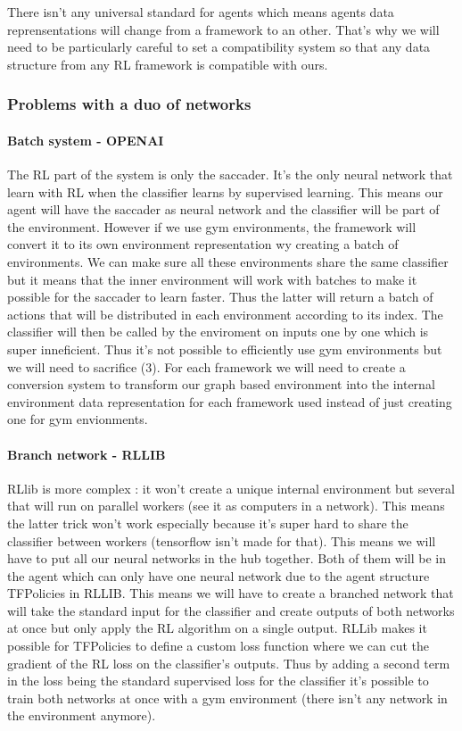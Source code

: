\documentclass[11pt]{article}
\begin{document}
There isn't any universal standard for agents which means agents data reprensentations will change from a framework to an other. That's why we will need to be particularly careful to set a compatibility system so that any data structure from any RL framework is compatible with ours.

\subsubsection{Problems with a duo of networks}
\paragraph{Batch system - OPENAI}
The RL part of the system is only the saccader. It's the only neural network that learn with RL when the classifier learns by supervised learning. This means our agent will have the saccader as neural network and the classifier will be part of the environment. However if we use gym environments, the framework will convert it to its own environment representation wy creating a batch of environments. We can make sure all these environments share the same classifier but it means that the inner environment will work with batches to make it possible for the saccader to learn faster. Thus the latter will return a batch of actions that will be distributed in each environment according to its index. The classifier will then be called by the enviroment on inputs one by one which is super inneficient. Thus it's not possible to efficiently use gym environments but we will need to sacrifice (3). For each framework we will need to create a conversion system to transform our graph based environment into the internal environment data representation for each framework used instead of just creating one for gym envionments.
\paragraph{Branch network - RLLIB}
RLlib is more complex : it won't create a unique internal environment but several that will run on parallel workers (see it as computers in a network). This means the latter trick won't work especially because it's super hard to share the classifier between workers (tensorflow isn't made for that). This means we will have to put all our neural networks in the hub together. Both of them will be in the agent which can only have one neural network due to the agent structure TFPolicies in RLLIB. This means we will have to create a branched network that will take the standard input for the classifier and create outputs of both networks at once but only apply the RL algorithm on a single output. RLLib makes it possible for TFPolicies to define a custom loss function where we can cut the gradient of the RL loss on the classifier's outputs. Thus by adding a second term in the loss being the standard supervised loss for the classifier it's possible to train both networks at once with a gym environment (there isn't any network in the environment anymore).
\end{document}

